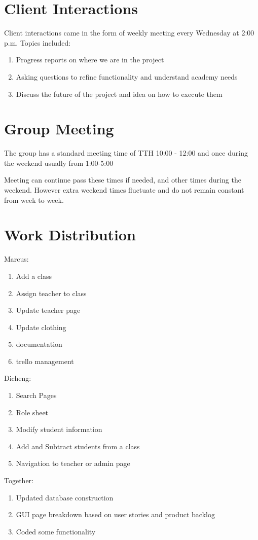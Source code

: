 \documentclass{book}
\begin{document}
\section{Client Interactions}

Client interactions came in the form of weekly meeting every Wednesday at 2:00 p.m. Topics included:

\begin{enumerate}
\item Progress reports on where we are in the project
\item Asking questions to refine functionality and understand academy needs
\item Discuss the future of the project and idea on how to execute them
\end{enumerate}


\section{Group Meeting}

The group has a standard meeting time of TTH 10:00 - 12:00 and once during the weekend usually from 1:00-5:00 

Meeting can continue pass these times if needed, and other times during the weekend. However extra weekend times fluctuate and do not remain constant from week to week. 

\section{Work Distribution}

Marcus:
\begin{enumerate}
\item Add a class
\item Assign teacher to class
\item Update teacher page
\item Update clothing
\item documentation
\item trello management\\
\end{enumerate}

Dicheng:
\begin{enumerate}
\item Search Pages
\item Role sheet
\item Modify student information
\item Add and Subtract students from a class
\item Navigation to teacher or admin page\\
\end{enumerate}


Together:
\begin{enumerate}
\item Updated database construction
\item GUI page breakdown based on user stories and product backlog
\item Coded some functionality
\end{enumerate}
\end{document}
